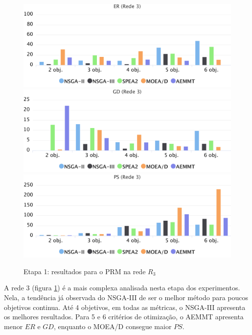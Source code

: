 \begin{figure}[!htbp]
	\caption{Etapa 1: resultados para o PRM na rede $R_3$}
	\label{fig_exp1_prm_r3}
	\includegraphics[width=1\textwidth]{cap_experimentos/figs/etapa1/er-mrp-r3}
	\includegraphics[width=1\textwidth]{cap_experimentos/figs/etapa1/gd-mrp-r3}
	\includegraphics[width=1\textwidth]{cap_experimentos/figs/etapa1/ps-mrp-r3}
\end{figure}

A rede 3 (figura \ref{fig_exp1_prm_r3}) é a mais complexa analisada nesta etapa dos experimentos. Nela, a tendência já observada do NSGA-III de ser o melhor método para poucos objetivos continua. Até 4 objetivos, em todas as métricas, o NSGA-III apresenta os melhores resultados. Para 5 e 6 critérios de otimização, o AEMMT apresenta menor $ER$ e $GD$, enquanto o MOEA/D consegue maior $PS$.

